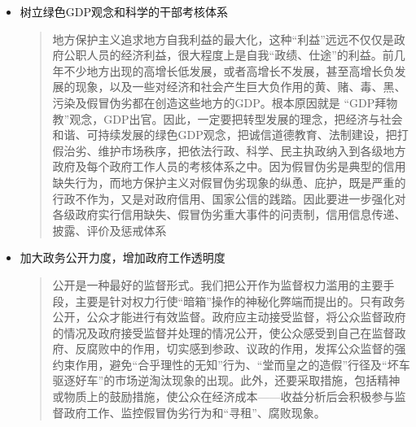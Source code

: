 \documentclass[11pt]{article}
\begin{document}
\begin{itemize}
\item 树立绿色GDP观念和科学的干部考核体系
\begin{quote}
地方保护主义追求地方自我利益的最大化，这种“利益”远远不仅仅是政府公职人员的经济利益，很大程度上是自我“政绩、仕途”的利益。前几年不少地方出现的高增长低发展，或者高增长不发展，甚至高增长负发展的现象，以及一些对经济和社会产生巨大负作用的黄、赌、毒、黑、污染及假冒伪劣都在创造这些地方的GDP。根本原因就是 “GDP拜物教”观念，GDP出官。因此，一定要把转型发展的理念，把经济与社会和谐、可持续发展的绿色GDP观念，把诚信道德教育、法制建设，把打假治劣、维护市场秩序，把依法行政、科学、民主执政纳入到各级地方政府及每个政府工作人员的考核体系之中。因为假冒伪劣是典型的信用缺失行为，而地方保护主义对假冒伪劣现象的纵恿、庇护，既是严重的行政不作为，又是对政府信用、国家公信的践踏。因此要进一步强化对各级政府实行信用缺失、假冒伪劣重大事件的问责制，信用信息传递、披露、评价及惩戒体系
\end{quote}
\item 加大政务公开力度，增加政府工作透明度
\begin{quote}
公开是一种最好的监督形式。我们把公开作为监督权力滥用的主要手段，主要是针对权力行使“暗箱”操作的神秘化弊端而提出的。只有政务公开，公众才能进行有效监督。政府应主动接受监督，将公众监督政府的情况及政府接受监督并处理的情况公开，使公众感受到自己在监督政府、反腐败中的作用，切实感到参政、议政的作用，发挥公众监督的强约束作用，避免“合乎理性的无知”行为、“堂而皇之的造假”行径及“坏车驱逐好车”的市场逆淘汰现象的出现。此外，还要采取措施，包括精神或物质上的鼓励措施，使公众在经济成本——收益分析后会积极参与监督政府工作、监控假冒伪劣行为和“寻租”、腐败现象。
\end{quote}
\end{itemize}
\end{document}
